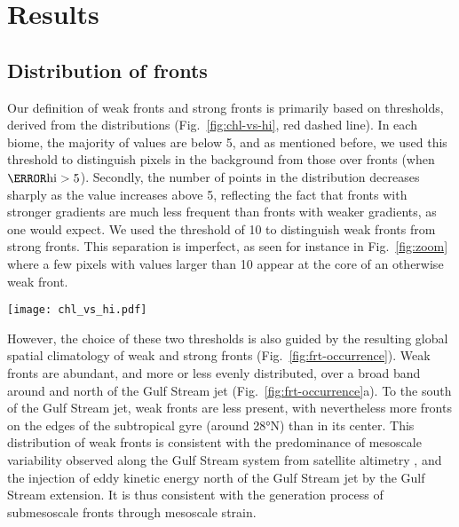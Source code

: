 \section{Results}

\subsection{Distribution of fronts}

Our definition of weak fronts and strong fronts is primarily based on thresholds, derived from the  distributions (Fig.~\ref{fig:chl-vs-hi}, red dashed line).
In each biome, the majority of  values are below 5, and as mentioned before, we used this threshold to distinguish pixels in the background from those over fronts (when \(\mathrm{\as{hi}} > 5\)).
Secondly, the number of points in the  distribution decreases sharply as the  value increases above 5, reflecting the fact that fronts with stronger  gradients are much less frequent than fronts with weaker gradients, as one would expect.
We used the  threshold of 10 to distinguish weak fronts from strong fronts.
This separation is imperfect, as seen for instance in Fig.~\ref{fig:zoom} where a few pixels with  values larger than 10 appear at the core of an otherwise weak front.

\begin{figure*}
  \texttt{[image: chl\_vs\_hi.pdf]}
  \caption{
    Normalized distribution of the Heterogeneity Index (, red dashed line) within each biome, and distribution of  as a function of  (representing front strength), over the full period 2000--2020.
    Shown are the median value of the  distributions (solid black line), and 1st and 3rd quartiles (dashed lines).
    Note that 0.5\% of pixels have outstanding large  values and are not included here.
  }%
  \label{fig:chl-vs-hi}
\end{figure*}

However, the choice of these two  thresholds is also guided by the resulting global spatial climatology of weak and strong fronts (Fig.~\ref{fig:frt-occurrence}).
Weak fronts are abundant, and more or less evenly distributed, over a broad band around and north of the Gulf Stream jet (Fig.~\ref{fig:frt-occurrence}a).
To the south of the Gulf Stream jet, weak fronts are less present, with nevertheless more fronts on the edges of the subtropical gyre (around 28°N) than in its center.
This distribution of weak fronts is consistent with the predominance of mesoscale variability observed along the Gulf Stream system from satellite altimetry \parencite{zhai_2008}, and the injection of eddy kinetic energy north of the Gulf Stream jet by the Gulf Stream extension.
It is thus consistent with the generation process of submesoscale fronts through mesoscale strain.

